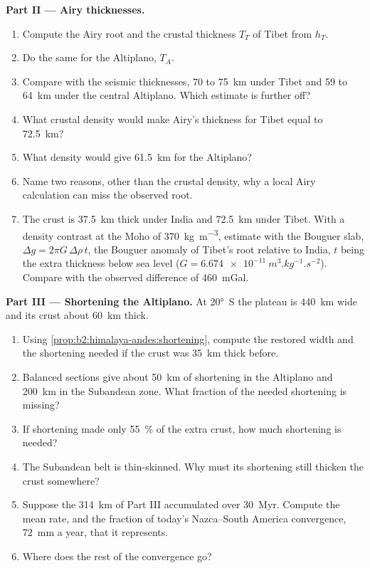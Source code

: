 \begin{problem}
\noindent\textbf{Part II --- Airy thicknesses.}
\begin{enumerate}[resume]
\item Compute the Airy root and the crustal thickness $T_T$ of Tibet from $h_T$.
\item Do the same for the Altiplano, $T_A$.
\item Compare with the seismic thicknesses, 70 to \qty{75}{km} under Tibet and 59 to
\qty{64}{km} under the central Altiplano. Which estimate is further off?
\item What crustal density would make Airy's thickness for Tibet equal to \qty{72.5}{km}?
\item What density would give \qty{61.5}{km} for the Altiplano?
\item Name two reasons, other than the crustal density, why a local Airy calculation can
miss the observed root.
\item The crust is \qty{37.5}{km} thick under India and \qty{72.5}{km} under Tibet. With a
density contrast at the Moho of \qty{370}{kg.m^{-3}}, estimate with the Bouguer slab, $\Delta g
= 2\pi G\,\Delta\rho\,t$, the Bouguer anomaly of Tibet's root relative to India, $t$ being the
extra thickness below sea level ($G = \qty{6.674e-11}{m^3.kg^{-1}.s^{-2}}$). Compare with the
observed difference of \qty{460}{mGal}.
\end{enumerate}

\noindent\textbf{Part III --- Shortening the Altiplano.} At \ang{20}~S the plateau is
\qty{440}{km} wide and its crust about \qty{60}{km} thick.
\begin{enumerate}[resume]
\item Using \cref{prop:b2:himalaya-andes:shortening}, compute the restored width and the
shortening needed if the crust was \qty{35}{km} thick before.
\item Balanced sections give about \qty{50}{km} of shortening in the Altiplano and
\qty{200}{km} in the Subandean zone. What fraction of the needed shortening is missing?
\item If shortening made only \qty{55}{\percent} of the extra crust, how much shortening is
needed?
\item The Subandean belt is thin-skinned. Why must its shortening still thicken the crust
somewhere?
\item Suppose the \qty{314}{km} of Part III accumulated over \qty{30}{Myr}. Compute the mean
rate, and the fraction of today's Nazca--South America convergence, \qty{72}{mm} a year, that
it represents.
\item Where does the rest of the convergence go?
\end{enumerate}


\end{problem}
